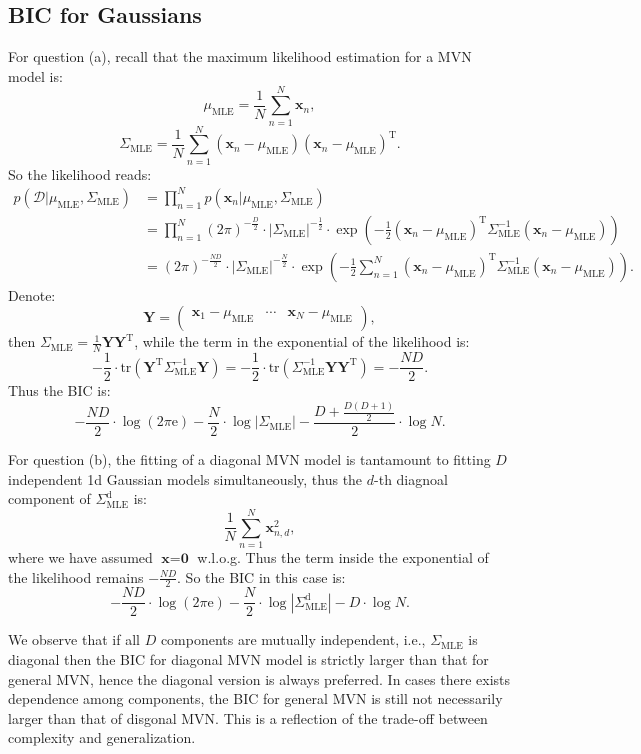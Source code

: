 \documentclass[UTF8]{ctexart}
\begin{document}
\subsection{BIC for Gaussians}
For question (a), recall that the maximum likelihood estimation for a MVN model is:
$$\mu_{\text{MLE}}=\frac{1}{N}\sum_{n=1}^{N}\textbf{x}_{n},$$
$$\Sigma_{\text{MLE}}=\frac{1}{N}\sum_{n=1}^{N}(\textbf{x}_{n}-\mu_{\text{MLE}})(\textbf{x}_{n}-\mu_{\text{MLE}})^{\text{T}}.$$
So the likelihood reads:
$$
\begin{aligned}
p(\mathcal{D}|\mu_{\text{MLE}},\Sigma_{\text{MLE}})&=\prod_{n=1}^{N}p(\textbf{x}_{n}|\mu_{\text{MLE}},\Sigma_{\text{MLE}})\\
&=\prod_{n=1}^{N}(2\pi)^{-\frac{D}{2}}\cdot |\Sigma_{\text{MLE}}|^{-\frac{1}{2}}\cdot\exp\left(-\frac{1}{2}(\textbf{x}_{n}-\mu_{\text{MLE}})^{\text{T}}\Sigma^{-1}_{\text{MLE}}(\textbf{x}_{n}-\mu_{\text{MLE}}) \right)\\
&=(2\pi)^{-\frac{ND}{2}}\cdot |\Sigma_{\text{MLE}}|^{-\frac{N}{2}}\cdot\exp\left(-\frac{1}{2}\sum_{n=1}^{N}(\textbf{x}_{n}-\mu_{\text{MLE}})^{\text{T}}\Sigma^{-1}_{\text{MLE}}(\textbf{x}_{n}-\mu_{\text{MLE}})   \right).
\end{aligned}
$$
Denote:
$$\textbf{Y}=\begin{pmatrix}
\textbf{x}_{1}-\mu_{\text{MLE}}& \cdots & \textbf{x}_{N}-\mu_{\text{MLE}} \\
\end{pmatrix},$$
then $\Sigma_{\text{MLE}}=\frac{1}{N}\textbf{Y}\textbf{Y}^{\text{T}}$, while the term in the exponential of the likelihood is:
$$-\frac{1}{2}\cdot\text{tr}(\textbf{Y}^{\text{T}}\Sigma^{-1}_{\text{MLE}}\textbf{Y})=-\frac{1}{2}\cdot\text{tr}(\Sigma^{-1}_{\text{MLE}}\textbf{Y}\textbf{Y}^{\text{T}})=-\frac{ND}{2}.$$
Thus the BIC is:
$$-\frac{ND}{2}\cdot\log(2\pi\text{e})-\frac{N}{2}\cdot\log|\Sigma_{\text{MLE}}|-\frac{D+\frac{D(D+1)}{2}}{2}\cdot\log N.$$

For question (b), the fitting of a diagonal MVN model is tantamount to fitting $D$ independent 1d Gaussian models simultaneously, thus the $d$-th diagnoal component of $\Sigma^{\text{d}}_{\text{MLE}}$ is:
$$\frac{1}{N}\sum_{n=1}^{N}\textbf{x}_{n,d}^{2},$$
where we have assumed $\textbf{x}=\textbf{0}$ w.l.o.g.
Thus the term inside the exponential of the likelihood remains $-\frac{ND}{2}$.
So the BIC in this case is:
$$-\frac{ND}{2}\cdot\log(2\pi\text{e})-\frac{N}{2}\cdot\log|\Sigma^{\text{d}}_{\text{MLE}}|-D\cdot\log N.$$

We observe that if all $D$ components are mutually independent, i.e., $\Sigma_{\text{MLE}}$ is diagonal then the BIC for diagonal MVN model is strictly larger than that for general MVN, hence the diagonal version is always preferred.
In cases there exists dependence among components, the BIC for general MVN is still not necessarily larger than that of disgonal MVN.
This is a reflection of the trade-off between complexity and generalization.
\end{document}
